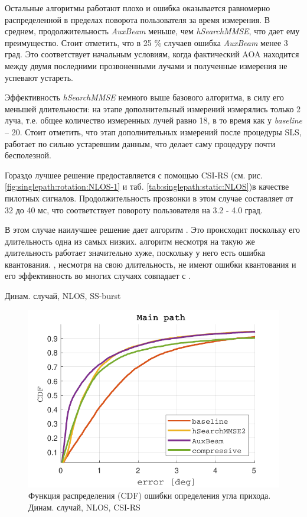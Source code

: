 Остальные алгоритмы работают плохо и ошибка оказывается равномерно
распределенной в пределах поворота пользователя за время измерения.  В среднем,
продолжительность \textit{AuxBeam} меньше, чем \textit{hSearchMMSE}, что дает
ему преимущество. Стоит отметить, что в 25 \% случаев ошибка \textit{AuxBeam}
менее 3 град. Это соответствует начальным условиям, когда фактический AOA
находится между двумя последними прозвоненными лучами и полученные измерения не успевают
устареть.

Эффективность \textit{hSearchMMSE} немного выше базового алгоритма, в силу 
его меньшей длительности: на этапе дополнительный измерений измерялись только 2 луча,
т.е. общее количество измеренных лучей равно 18, в то время как у \textit{baseline} --
20. Стоит отметить, что этап дополнительных измерений после процедуры SLS, работает по сильно 
устаревшим данным, что делает саму процедуру почти бесполезной. 

Гораздо лучшее решение предоставляется с помощью CSI-RS (см. рис.
\ref{fig:singlepath:rotation:NLOS-1} и таб. \ref{tab:singlepath:static:NLOS})в
качестве пилотных сигналов. Продолжительность прозвонки в этом случае составляет
от 32 до 40 мс, что соответствует повороту пользователя на 3.2 - 4.0 град.

В этом случае наилучшее решение дает алгоритм \AuxBeam. Это происходит поскольку
его длительность одна из самых низких. 
\ACS алгоритм несмотря на такую же длительность работает значительно хуже, 
поскольку у него есть ошибка квантования.
\hSearchMMSE, несмотря на свою длительность, не имеют ошибки квантования и его 
эффективность во многих случаях совпадает с \AuxBeam.
\begin{table}[h!]
  \begin{center}
    \caption{Динам. случай, NLOS, SS-burst}
    \small
    \label{tab:singlepath:rotation:NLOS}
  \end{center}
\end{table}

\begin{figure}[ht]
  \centering
  \includegraphics{results/rus/singlepath-rotation-NLOS-CSI-RS-1}
  \caption{Функция распределения (CDF) ошибки определения угла прихода. Динам. случай, NLOS, CSI-RS}
  \label{fig:singlepath:rotation:NLOS-2}
\end{figure}

